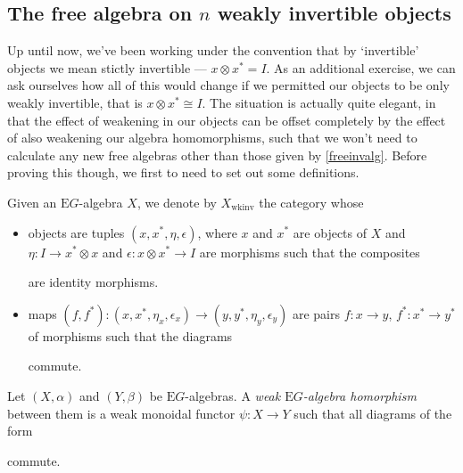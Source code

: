 \documentclass{amsart} %
\newenvironment{eq*}{\begin{equation*}}{\end{equation*}}
\begin{document}
\subsection{The free algebra on $n$ weakly invertible objects}

Up until now, we've been working under the convention that by `invertible' objects we mean stictly invertible --- $x \otimes x^* = I$. As an additional exercise, we can ask ourselves how all of this would change if we permitted our objects to be only weakly invertible, that is $x \otimes x^* \cong I$. The situation is actually quite elegant, in that the effect of weakening in our objects can be offset completely by the effect of also weakening our algebra homomorphisms, such that we won't need to calculate any new free algebras other than those given by \cref{freeinvalg}. Before proving this though, we first to need to set out some definitions.

\begin{defn} Given an $\mathrm{E}G$-algebra $X$, we denote by $X_{\mathrm{wkinv}}$ the category whose
\begin{itemize}
\item objects are tuples $(x, x^*, \eta, \epsilon)$, where $x$ and $x^*$ are objects of $X$ and $\eta: I \to x^* \otimes x$ and $\epsilon : x \otimes x^* \to I$ are morphisms such that the composites
\begin{eq*} 
\end{eq*}
are identity morphisms.
\item maps $(f, f^*): (x, x^*, \eta_x, \epsilon_x) \to (y, y^*, \eta_y, \epsilon_y)$ are pairs $f: x \to y$, $f^* : x^* \to y^*$ of morphisms such that the diagrams
\begin{eq*} 
\end{eq*}
commute.
\end{itemize}
\end{defn}

\begin{defn}\label{weakmonfunc} Let $(X, \alpha)$ and $(Y, \beta)$ be $\mathrm{E}G$-algebras. A \emph{weak $\mathrm{E}G$-algebra homorphism} between them is a weak monoidal functor $\psi: X \to Y$ such that all diagrams of the form
\begin{eq*} 
\end{eq*}
commute.
\end{defn}
\end{document}
